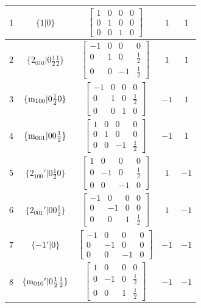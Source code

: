 \documentclass[fleqn,8pt]{jsarticle}
\begin{document}
\begin{longtable}{ccccc}
$ 1 $ & $ \{1|0\} $ & $ \begin{bmatrix} 1 & 0 & 0 & 0 \\ 0 & 1 & 0 & 0 \\ 0 & 0 & 1 & 0 \end{bmatrix} $ & $ 1 $ & $ 1 $ \\ \hline
$ 2 $ & $ \{2{}_{010}|0 \frac{1}{2} \frac{1}{2}\} $ & $ \begin{bmatrix} -1 & 0 & 0 & 0 \\ 0 & 1 & 0 & \frac{1}{2} \\ 0 & 0 & -1 & \frac{1}{2} \end{bmatrix} $ & $ 1 $ & $ 1 $ \\ \hline
$ 3 $ & $ \{{\rm m}_{100}|0 \frac{1}{2} 0\} $ & $ \begin{bmatrix} -1 & 0 & 0 & 0 \\ 0 & 1 & 0 & \frac{1}{2} \\ 0 & 0 & 1 & 0 \end{bmatrix} $ & $ -1 $ & $ 1 $ \\ \hline
$ 4 $ & $ \{{\rm m}_{001}|0 0 \frac{1}{2}\} $ & $ \begin{bmatrix} 1 & 0 & 0 & 0 \\ 0 & 1 & 0 & 0 \\ 0 & 0 & -1 & \frac{1}{2} \end{bmatrix} $ & $ -1 $ & $ 1 $ \\ \hline
$ 5 $ & $ \{2{}_{100}{}'|0 \frac{1}{2} 0\} $ & $ \begin{bmatrix} 1 & 0 & 0 & 0 \\ 0 & -1 & 0 & \frac{1}{2} \\ 0 & 0 & -1 & 0 \end{bmatrix} $ & $ 1 $ & $ -1 $ \\ \hline
$ 6 $ & $ \{2{}_{001}{}'|0 0 \frac{1}{2}\} $ & $ \begin{bmatrix} -1 & 0 & 0 & 0 \\ 0 & -1 & 0 & 0 \\ 0 & 0 & 1 & \frac{1}{2} \end{bmatrix} $ & $ 1 $ & $ -1 $ \\ \hline
$ 7 $ & $ \{-1{}'|0\} $ & $ \begin{bmatrix} -1 & 0 & 0 & 0 \\ 0 & -1 & 0 & 0 \\ 0 & 0 & -1 & 0 \end{bmatrix} $ & $ -1 $ & $ -1 $ \\ \hline
$ 8 $ & $ \{{\rm m}_{010}{}'|0 \frac{1}{2} \frac{1}{2}\} $ & $ \begin{bmatrix} 1 & 0 & 0 & 0 \\ 0 & -1 & 0 & \frac{1}{2} \\ 0 & 0 & 1 & \frac{1}{2} \end{bmatrix} $ & $ -1 $ & $ -1 $ \\
\end{longtable}
\end{document}
